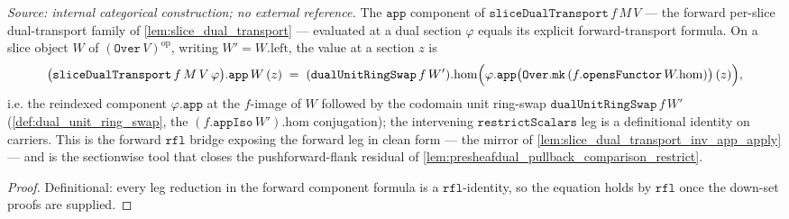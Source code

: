 \begin{lemma}
  \label{lem:slice_dual_transport_app_apply}
  \textit{Source: internal categorical construction; no external reference.}
  The \(\mathtt{app}\) component of \(\mathtt{sliceDualTransport}\,f\,M\,V\) --- the forward per-slice
  dual-transport family of \cref{lem:slice_dual_transport} --- evaluated at a dual section
  \(\varphi\) equals its explicit forward-transport formula. On a slice object \(W\) of
  \((\mathtt{Over}\,V)^{\mathrm{op}}\), writing \(W' = W.\mathrm{left}\), the value at a section
  \(z\) is
  \[
    \bigl(\mathtt{sliceDualTransport}\,f\,M\,V\,\varphi\bigr).\mathtt{app}\,W\,(z)
      \;=\;
    (\mathtt{dualUnitRingSwap}\,f\,W').\mathrm{hom}\Bigl(
      \varphi.\mathtt{app}\bigl(\mathtt{Over.mk}\,(f.\mathtt{opensFunctor}\,W.\mathrm{hom})\bigr)\,(z)\Bigr),
  \]
  i.e. the reindexed component \(\varphi.\mathtt{app}\) at the \(f\)-image of \(W\) followed by the
  codomain unit ring-swap \(\mathtt{dualUnitRingSwap}\,f\,W'\) (\cref{def:dual_unit_ring_swap}, the
  \((f.\mathtt{appIso}\,W').\mathrm{hom}\) conjugation); the intervening \(\mathtt{restrictScalars}\)
  leg is a definitional identity on carriers. This is the forward \(\mathtt{rfl}\) bridge exposing
  the forward leg in clean form --- the mirror of \cref{lem:slice_dual_transport_inv_app_apply} ---
  and is the sectionwise tool that closes the pushforward-flank residual of
  \cref{lem:presheafdual_pullback_comparison_restrict}.
\end{lemma}
\begin{proof}
  \leanok
  Definitional: every leg reduction in the forward component formula is a \(\mathtt{rfl}\)-identity,
  so the equation holds by \(\mathtt{rfl}\) once the down-set proofs are supplied.
\end{proof}

